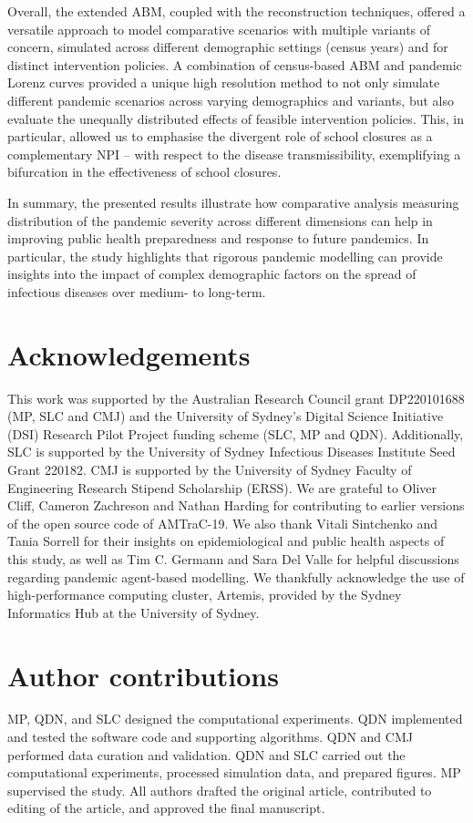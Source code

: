 \documentclass{article}
\begin{document}
Overall, the extended ABM, coupled with the reconstruction techniques, offered a versatile approach to model comparative scenarios with multiple variants of concern, simulated across different demographic settings (census years) and for distinct intervention policies. A combination of census-based ABM and pandemic Lorenz curves provided a unique high resolution method to not only simulate different pandemic scenarios across varying demographics and variants, but also evaluate the unequally distributed effects of feasible intervention policies. This, in particular, allowed us to emphasise the divergent role of school closures as a complementary NPI -- with respect to the disease transmissibility, exemplifying a bifurcation in the effectiveness of school closures.

In summary, the presented results illustrate how comparative analysis measuring distribution of the pandemic severity across different dimensions can help in improving public health preparedness and response to future pandemics. In particular, the study highlights that rigorous pandemic modelling can provide insights into the impact of complex demographic factors on the spread of infectious diseases over medium- to long-term.

\section*{Acknowledgements}
 This work was supported by the Australian Research Council grant DP220101688 (MP, SLC and CMJ) and the University of Sydney's Digital Science Initiative (DSI) Research Pilot Project funding scheme (SLC, MP and QDN). Additionally, SLC is supported by the University of Sydney Infectious Diseases Institute Seed Grant 220182. CMJ is supported by the University of Sydney Faculty of Engineering Research Stipend Scholarship (ERSS). We are grateful to Oliver Cliff, Cameron Zachreson and Nathan Harding for contributing to earlier versions of the open source code of AMTraC-19. We also thank Vitali Sintchenko and Tania Sorrell for their insights on epidemiological and public health aspects of this study, as well as Tim C. Germann and Sara Del Valle for helpful discussions regarding pandemic agent-based modelling. We thankfully acknowledge the use of high-performance computing cluster, Artemis, provided by the Sydney Informatics Hub at the University of Sydney.

\section*{Author contributions}
MP, QDN, and SLC designed the computational experiments. QDN implemented and tested the software code and supporting algorithms. QDN and CMJ performed data curation and validation. QDN and SLC carried out the computational experiments, processed simulation data, and prepared figures. MP supervised the study.  All authors drafted the original article, contributed to editing of the article, and approved the final manuscript.
\end{document}
